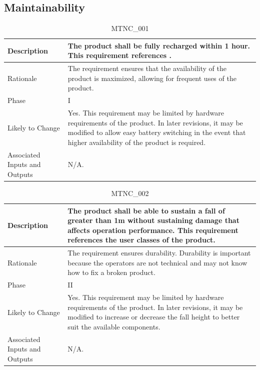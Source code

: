 \documentclass{article}
\begin{document}
\clearpage
\newpage

\subsection{Maintainability}
\begin{table}[!h]
\begin{center}
\caption {MTNC\_001} 
\label{MTNC_001}
\begin{tabular}{ | m{3cm} | m{11cm} | }
\hline
Description & The product shall be fully recharged within 1 hour. This requirement references \nameref{USE_003}. \\
\hline
Rationale & The requirement ensures that the availability of the product is maximized, allowing for frequent uses of the product. \\
\hline
Phase & I \\
\hline
Likely to Change & Yes. This requirement may be limited by hardware requirements of the product. In later revisions, it may be modified to allow easy battery switching in the event that higher availability of the product is required. \\
\hline
Associated Inputs and Outputs & N/A.  \\
\hline
\end{tabular}
\end{center}
\end{table}

\begin{table}[!h]
\begin{center}
\caption {MTNC\_002} 
\label{MTNC_002}
\begin{tabular}{ | m{3cm} | m{11cm} | }
\hline
Description & The product shall be able to sustain a fall of greater than 1m without sustaining damage that affects operation performance. This requirement references the user classes of the product.\\
\hline
Rationale & The requirement ensures durability. Durability is important because the operators are not technical and may not know how to fix a broken product. \\
\hline
Phase & II \\
\hline
Likely to Change & Yes. This requirement may be limited by hardware requirements of the product. In later revisions, it may be modified to increase or decrease the fall height to better suit the available components. \\
\hline
Associated Inputs and Outputs & N/A.  \\
\hline
\end{tabular}
\end{center}
\end{table}
\end{document}

